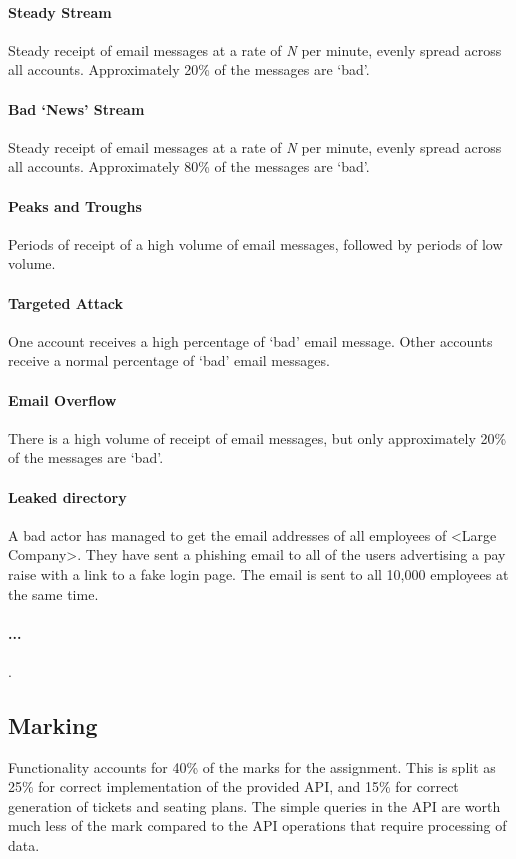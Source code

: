 \documentclass{csse4400}
\begin{document}
\paragraph{Steady Stream}
Steady receipt of email messages at a rate of \emph{N} per minute, evenly spread across all accounts. Approximately 20\% of the messages are `bad'.

\paragraph{Bad `News' Stream}
Steady receipt of email messages at a rate of \emph{N} per minute, evenly spread across all accounts. Approximately 80\% of the messages are `bad'.

\paragraph{Peaks and Troughs}
Periods of receipt of a high volume of email messages, followed by periods of low volume.

\paragraph{Targeted Attack}
One account receives a high percentage of `bad' email message. Other accounts receive a normal percentage of `bad' email messages.

\paragraph{Email Overflow}
There is a high volume of receipt of email messages, but only approximately 20\% of the messages are `bad'.

\paragraph{Leaked directory}
A bad actor has managed to get the email addresses of all employees of <Large Company>. They have sent a phishing email to all of the users advertising a pay raise with a link to a fake login page. The email is sent to all 10,000 employees at the same time.

\paragraph{...}
.

\subsection{Marking}
Functionality accounts for 40\% of the marks for the assignment. This is split as 25\% for correct implementation of the provided API, and 15\% for correct generation of tickets and seating plans. The simple queries in the API are worth much less of the mark compared to the API operations that require processing of data.
\end{document}
